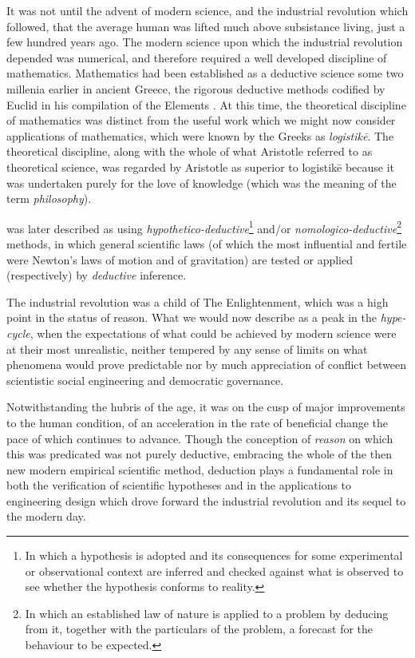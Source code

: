 \documentclass[10pt,titlepage]{book}
\begin{document}
It was not until the advent of modern science, and the industrial revolution which followed, that the average human was lifted much above subsistance living, just a few hundred years ago.
The modern science upon which the industrial revolution depended was numerical, and therefore required a well developed discipline of mathematics.
Mathematics had been established as a deductive science some two millenia earlier in ancient Greece, the rigorous deductive methods codified by Euclid in his compilation of the Elements \cite{euclidEL1}.
At this time, the theoretical discipline of mathematics was distinct from the useful work which we might now consider applications of mathematics, which were known by the Greeks as \emph{logistikē}.
The theoretical discipline, along with the whole of what Aristotle referred to as theoretical science, was regarded by Aristotle as superior to logistikē because it was undertaken purely for the love of knowledge (which was the meaning of the term \emph{philosophy}).

was later described as using \emph{hypothetico-deductive}\footnote{In which a hypothesis is adopted and its consequences for some experimental or observational context are inferred and checked against what is observed to see whether the hypothesis conforms to reality.} and/or \emph{nomologico-deductive}\footnote{In which an established law of nature is applied to a problem by deducing from it, together with the particulars of the problem, a forecast for the behaviour to be expected.} methods, in which general scientific laws (of which the most influential and fertile were Newton's laws of motion and of gravitation) are tested or applied (respectively) by \emph{deductive} inference.

The industrial revolution was a child of The Enlightenment, which was a high point in the status of reason.
What we would now describe as a peak in the \emph{hype-cycle}, when the expectations of what could be achieved by modern science were at their most unrealistic, neither tempered by any sense of limits on what phenomena would prove predictable nor by much appreciation of conflict between scientistic social engineering and democratic governance.

Notwithstanding the hubris of the age, it was on the cusp of major improvements to the human condition, of an acceleration in the rate of beneficial change the pace of which continues to advance.
Though the conception of \emph{reason} on which this was predicated was not purely deductive, embracing the whole of the then new modern empirical scientific method, deduction plays a fundamental role in both the verification of scientific hypotheses and in the applications to engineering design which drove forward the industrial revolution and its sequel to the modern day.
\end{document}
